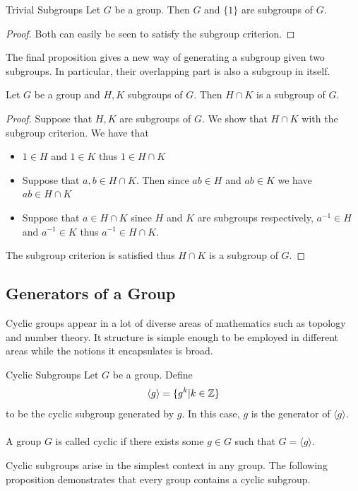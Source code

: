 \documentclass[a4paper]{article}
\begin{document}
\begin{lmm}{Trivial Subgroups}{} Let $G$ be a group. Then $G$ and $\{1\}$ are subgroups of $G$. \tcbline
\begin{proof} Both can easily be seen to satisfy the subgroup criterion. 
\end{proof}
\end{lmm}

The final proposition gives a new way of generating a subgroup given two subgroups. In particular, their overlapping part is also a subgroup in itself. 

\begin{prp}{}{} Let $G$ be a group and $H,K$ subgroups of $G$. Then $H\cap K$ is a subgroup of $G$. \tcbline
\begin{proof} Suppose that $H,K$ are subgroups of $G$. We show that $H\cap K$ with the subgroup criterion. We have that 
\begin{itemize}
\item $1\in H$ and $1\in K$ thus $1\in H\cap K$
\item Suppose that $a,b\in H\cap K$. Then since $ab\in H$ and $ab\in K$ we have $ab\in H\cap K$
\item Suppose that $a\in H\cap K$ since $H$ and $K$ are subgroups respectively, $a^{-1}\in H$ and $a^{-1}\in K$ thus $a^{-1}\in H\cap K$. 
\end{itemize}
The subgroup criterion is satisfied thus $H\cap K$ is a subgroup of $G$. 
\end{proof}
\end{prp}

\subsection{Generators of a Group}
Cyclic groups appear in a lot of diverse areas of mathematics such as topology and number theory. It structure is simple enough to be employed in different areas while the notions it encapsulates is broad. 

\begin{defn}{Cyclic Subgroups}{} Let $G$ be a group. Define $$\langle g\rangle=\{g^k|k\in\mathbb{Z}\}$$ to be the cyclic subgroup generated by $g$. In this case, $g$ is the generator of $\langle g\rangle$. \\~\\
A group $G$ is called cyclic if there exists some $g\in G$ such that $G=\langle g\rangle$. 
\end{defn}

Cyclic subgroups arise in the simplest context in any group. The following proposition demonstrates that every group contains a cyclic subgroup. 
\end{document}
